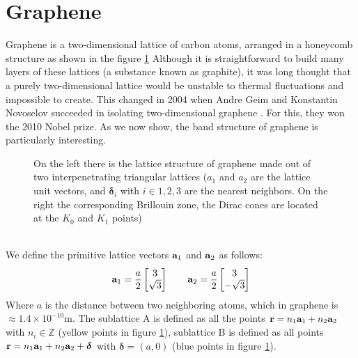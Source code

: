 \section{Graphene}
Graphene is a two-dimensional lattice of carbon atoms, arranged in a honeycomb structure as shown in the figure \ref{fig:graphene} Although it is straightforward to build many layers of these lattices (a substance known as graphite), it was long thought that a purely two-dimensional lattice would be unstable to thermal fluctuations and impossible to create.
This changed in 2004 when Andre Geim and Konstantin Novoselov succeeded in isolating two-dimensional graphene \cite{firstExfoliation}. For this, they won the 2010 Nobel prize. As we now show, the band structure of graphene is particularly interesting.
\begin{figure}[h]
    \caption{On the left there is the lattice structure of graphene made out of two interpenetrating triangular lattices ($a_1$ and $a_2$ are the lattice unit vectors, and $\mathbf \delta_{i}$ with $i\in {1,2,3}$ are the nearest neighbors. On the right the corresponding Brillouin zone, the Dirac cones are located at the $K_0$ and $K_1$ points) \cite{guinea2008review}}
    \label{fig:graphene}
\end{figure}\\
We define the primitive lattice vectors $\mathbf{a}_1$ and $\mathbf{a}_2$ as follows:
\begin{equation}
    \mathbf{a}_1=\frac{a}2
    \begin{bmatrix}
        3 \\ \sqrt 3
    \end{bmatrix}\quad \quad
    \mathbf{a}_2=\frac{a}2
    \begin{bmatrix}
        3 \\ -\sqrt 3
    \end{bmatrix}
\end{equation}
Where $a$ is the distance between two neighboring atoms, which in graphene is $\approx 1.4\times 10^{-10}$m. The sublattice A is defined as all the points $\mathbf{r} = n_1\mathbf{a}_1 + n_2\mathbf{a}_2$ with $n_i \in \mathbb Z$ (yellow points in figure \ref{fig:graphene}), sublattice B is defined as all points $\mathbf{r} = n_1\mathbf{a}_1 + n_2\mathbf{a}_2 + \boldsymbol\delta$ with $\boldsymbol\delta = (a, 0)$ (blue points in figure \ref{fig:graphene}).

